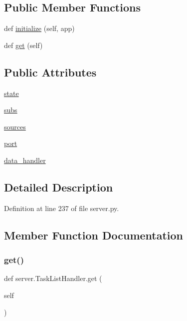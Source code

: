 \subsection*{Public Member Functions}
\begin{DoxyCompactItemize}
\item 
def \hyperlink{classserver_1_1TaskListHandler_a9d75887c9b129d1acb943fb72252496b}{initialize} (self, app)
\item 
def \hyperlink{classserver_1_1TaskListHandler_a137d4866bf8522230742085684e903c5}{get} (self)
\end{DoxyCompactItemize}
\subsection*{Public Attributes}
\begin{DoxyCompactItemize}
\item 
\hyperlink{classserver_1_1TaskListHandler_a12cde41b09e7707bdb666f062809dacb}{state}
\item 
\hyperlink{classserver_1_1TaskListHandler_ab188a6952aceade11a652921734b6174}{subs}
\item 
\hyperlink{classserver_1_1TaskListHandler_afdf8db7f8a94d1254eb0997f04d25c43}{sources}
\item 
\hyperlink{classserver_1_1TaskListHandler_a1a0646b89b94e763368c3b38d801203b}{port}
\item 
\hyperlink{classserver_1_1TaskListHandler_a2c8f8c9268f03d607605b72d231b0a14}{data\+\_\+handler}
\end{DoxyCompactItemize}


\subsection{Detailed Description}


Definition at line 237 of file server.\+py.



\subsection{Member Function Documentation}
\mbox{\label{classserver_1_1TaskListHandler_a137d4866bf8522230742085684e903c5}} 
\subsubsection{\texorpdfstring{get()}{get()}}
{\footnotesize\ttfamily def server.\+Task\+List\+Handler.\+get (\begin{DoxyParamCaption}\item[{}]{self }\end{DoxyParamCaption})}



